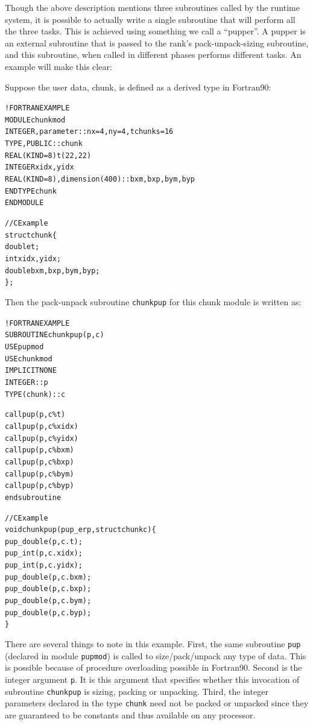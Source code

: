 \documentclass[10pt]{article}
\begin{document}
Though the above description mentions three subroutines called by the \ampi{}
runtime system, it is possible to actually write a single subroutine that will
perform all the three tasks. This is achieved using something we call a
``pupper''. A pupper is an external subroutine that is passed to the rank's
pack-unpack-sizing subroutine, and this subroutine, when called in different
phases performs different tasks. An example will make this clear:

Suppose the user data, chunk, is defined as a derived type in Fortran90:

\begin{alltt}
!FORTRAN EXAMPLE
MODULE chunkmod
  INTEGER, parameter :: nx=4, ny=4, tchunks=16
  TYPE, PUBLIC :: chunk
      REAL(KIND=8) t(22,22)
      INTEGER xidx, yidx
      REAL(KIND=8), dimension(400):: bxm, bxp, bym, byp
  END TYPE chunk
END MODULE

//C Example
struct chunk\{
  double t;
  int xidx, yidx;
  double bxm,bxp,bym,byp;
\};
\end{alltt}

Then the pack-unpack subroutine \texttt{chunkpup} for this chunk module is
written as:

\begin{alltt}
!FORTRAN EXAMPLE
SUBROUTINE chunkpup(p, c)
  USE pupmod
  USE chunkmod
  IMPLICIT NONE
  INTEGER :: p
  TYPE(chunk) :: c

  call pup(p, c\%t)
  call pup(p, c\%xidx)
  call pup(p, c\%yidx)
  call pup(p, c\%bxm)
  call pup(p, c\%bxp)
  call pup(p, c\%bym)
  call pup(p, c\%byp)
end subroutine

//C Example
void chunkpup(pup_er p, struct chunk c)\{
  pup_double(p,c.t);
  pup_int(p,c.xidx);
  pup_int(p,c.yidx);
  pup_double(p,c.bxm);
  pup_double(p,c.bxp);
  pup_double(p,c.bym);
  pup_double(p,c.byp);
\}
\end{alltt}

There are several things to note in this example. First, the same subroutine
\texttt{pup} (declared in module \texttt{pupmod}) is called to size/pack/unpack
any type of data. This is possible because of procedure overloading possible in
Fortran90. Second is the integer argument \texttt{p}. It is this argument that
specifies whether this invocation of subroutine \texttt{chunkpup} is sizing,
packing or unpacking. Third, the integer parameters declared in the type
\texttt{chunk} need not be packed or unpacked since they are guaranteed to be
constants and thus available on any processor.
\end{document}
